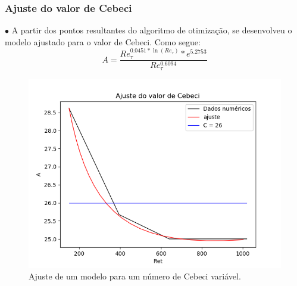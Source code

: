 \documentclass[xcolor=dvipsnames,10pt,aspectratio=169]{beamer}
\begin{document}
		\begin{frame}
		\frametitle{Ajuste do valor de Cebeci}
		\begin{minipage}[h!]{0.45\textwidth}
			$\bullet$ A partir dos pontos resultantes do algoritmo de otimização, se desenvolveu o modelo ajustado para o valor de Cebeci. Como segue:
			\begin{equation}
			A = \frac{Re_\tau ^{0.0451 * \ln(Re_\tau)} *e ^ {5.2753} }{Re_\tau ^{0.6094}}
			\end{equation}
		\end{minipage}\hfill
		\begin{minipage}[h!]{0.45\textwidth}
		\begin{figure}
			\centering
			\includegraphics[angle=0, scale=0.42]{ajustecebeci}
			\caption{Ajuste de um modelo para um número de Cebeci variável.}
		\end{figure}
		\end{minipage}
		\end{frame}	

	
	
	
	
\end{document}
